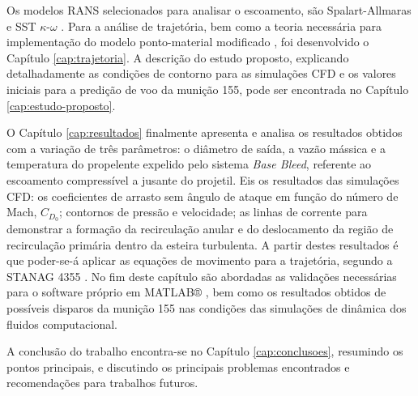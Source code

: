 Os modelos RANS selecionados para analisar o escoamento, são Spalart-Allmaras \cite{Spalart1992} e SST $\kappa$-$\omega$ \cite{Menter1994TwoequationET,Menter2003,Menter2009}. Para a análise de trajetória, bem como a teoria necessária para implementação do modelo ponto-material modificado \cite{stanag4355}, foi desenvolvido o Capítulo \ref{cap:trajetoria}. A descrição do estudo proposto, explicando detalhadamente as condições de contorno para as simulações CFD e os valores iniciais para a predição de voo da munição \qty{155}{\millimetre}, pode ser encontrada no Capítulo \ref{cap:estudo-proposto}.

O Capítulo \ref{cap:resultados} finalmente apresenta e analisa os resultados obtidos com a variação de três parâmetros: o diâmetro de saída, a vazão mássica e a temperatura do propelente expelido pelo sistema \textit{Base Bleed}, referente ao escoamento compressível a jusante do projetil. Eis os resultados das simulações CFD: os coeficientes de arrasto sem ângulo de ataque em função do número de Mach, \(C_{D_{0}}\); contornos de pressão e velocidade; as linhas de corrente para demonstrar a formação da recirculação anular e do deslocamento da região de recirculação primária dentro da esteira turbulenta. A partir destes resultados é que poder-se-á aplicar as equações de movimento para a trajetória, segundo a STANAG 4355 \cite{stanag4355}. No fim deste capítulo são abordadas as validações necessárias para o software próprio em MATLAB® \cite{ThallyoENCIT2022,Thallyo2022}, bem como os resultados obtidos de possíveis disparos da munição \qty{155}{\millimetre} nas condições das simulações de dinâmica dos fluidos computacional. 

A conclusão do trabalho encontra-se no Capítulo \ref{cap:conclusoes}, resumindo os pontos principais, e discutindo os principais problemas encontrados e recomendações para trabalhos futuros.